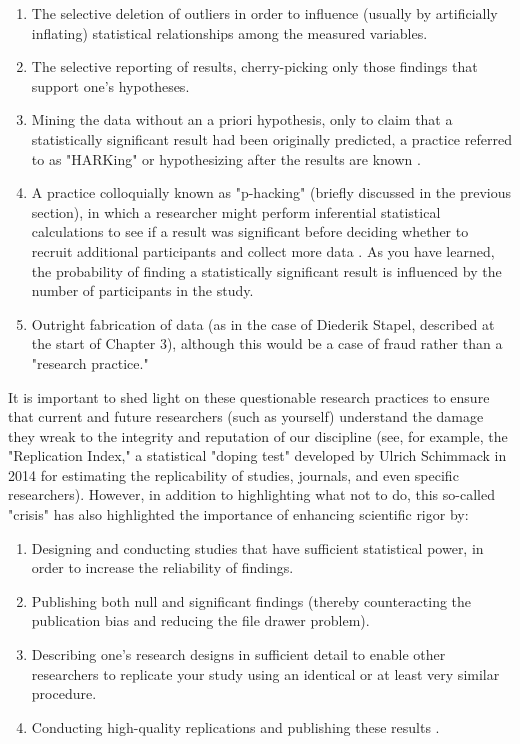 \begin{enumerate}
\item The selective deletion of outliers in order to influence (usually by artificially inflating) statistical relationships among the measured variables.

\item The selective reporting of results, cherry-picking only those findings that support one's hypotheses.
\item Mining the data without an a priori hypothesis, only to claim that a statistically significant result had been originally predicted, a practice referred to as "HARKing" or hypothesizing after the results are known \citep{kerr_harking:_1998}.

\item A practice colloquially known as "p-hacking" (briefly discussed in the previous section), in which a researcher might perform inferential statistical calculations to see if a result was significant before deciding whether to recruit additional participants and collect more data \citep{head_extent_2015}. As you have learned, the probability of finding a statistically significant result is influenced by the number of participants in the study.

\item Outright fabrication of data (as in the case of Diederik Stapel, described at the start of Chapter 3), although this would be a case of fraud rather than a "research practice."

\end{enumerate}

It is important to shed light on these questionable research practices to ensure that current and future researchers (such as yourself) understand the damage they wreak to the integrity and reputation of our discipline (see, for example, the "Replication Index," a statistical "doping test" developed by Ulrich Schimmack in 2014 for estimating the replicability of studies, journals, and even specific researchers). However, in addition to highlighting what not to do, this so-called "crisis" has also highlighted the importance of enhancing scientific rigor by:


\begin{enumerate}
\item Designing and conducting studies that have sufficient statistical power, in order to increase the reliability of findings.

\item Publishing both null and significant findings (thereby counteracting the publication bias and reducing the file drawer problem).

\item Describing one's research designs in sufficient detail to enable other researchers to replicate your study using an identical or at least very similar procedure.

\item Conducting high-quality replications and publishing these results \citep{brandt_replication_2014}.

\end{enumerate}

